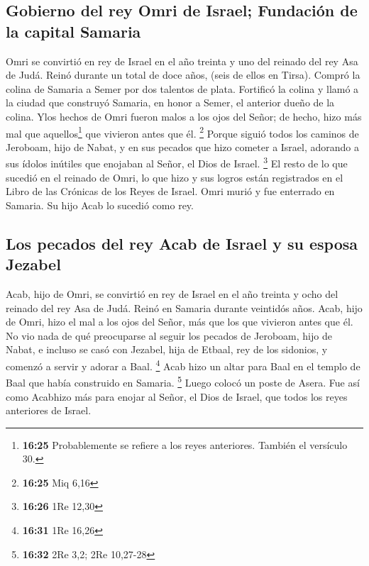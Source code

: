 \hypertarget{gobierno-del-rey-omri-de-israel-fundaciuxf3n-de-la-capital-samaria}{%
\subsection{Gobierno del rey Omri de Israel; Fundación de la capital
Samaria}\label{gobierno-del-rey-omri-de-israel-fundaciuxf3n-de-la-capital-samaria}}

 Omri se convirtió en rey de Israel en el año treinta y
uno del reinado del rey Asa de Judá. Reinó durante un total de doce
años, (seis de ellos en Tirsa).  Compró la colina de
Samaria a Semer por dos talentos de plata. Fortificó la colina y llamó a
la ciudad que construyó Samaria, en honor a Semer, el anterior dueño de
la colina.  Ylos hechos de Omri fueron malos a los ojos
del Señor; de hecho, hizo más mal que aquellos\footnote{\textbf{16:25}
  Probablemente se refiere a los reyes anteriores. También el versículo
  30.} que vivieron antes que él. \footnote{\textbf{16:25} Miq 6,16}
 Porque siguió todos los caminos de Jeroboam, hijo de
Nabat, y en sus pecados que hizo cometer a Israel, adorando a sus ídolos
inútiles que enojaban al Señor, el Dios de Israel. \footnote{\textbf{16:26}
  1Re 12,30}  El resto de lo que sucedió en el reinado de
Omri, lo que hizo y sus logros están registrados en el Libro de las
Crónicas de los Reyes de Israel.  Omri murió y fue
enterrado en Samaria. Su hijo Acab lo sucedió como rey.

\hypertarget{los-pecados-del-rey-acab-de-israel-y-su-esposa-jezabel}{%
\subsection{Los pecados del rey Acab de Israel y su esposa
Jezabel}\label{los-pecados-del-rey-acab-de-israel-y-su-esposa-jezabel}}

 Acab, hijo de Omri, se convirtió en rey de Israel en el
año treinta y ocho del reinado del rey Asa de Judá. Reinó en Samaria
durante veintidós años.  Acab, hijo de Omri, hizo el mal
a los ojos del Señor, más que los que vivieron antes que él.
 No vio nada de qué preocuparse al seguir los pecados de
Jeroboam, hijo de Nabat, e incluso se casó con Jezabel, hija de Etbaal,
rey de los sidonios, y comenzó a servir y adorar a Baal. \footnote{\textbf{16:31}
  1Re 16,26}  Acab hizo un altar para Baal en el templo
de Baal que había construido en Samaria. \footnote{\textbf{16:32} 2Re
  3,2; 2Re 10,27-28}  Luego colocó un poste de Asera. Fue
así como Acabhizo más para enojar al Señor, el Dios de Israel, que todos
los reyes anteriores de Israel.


